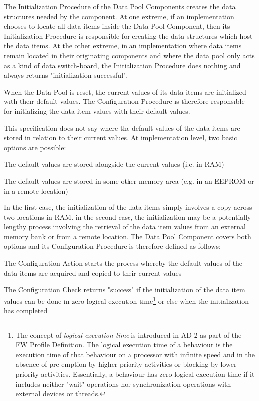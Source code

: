 \documentclass[a4paper,10pt]{article}
\newenvironment{fw_itemize}						%
{\begin{itemize}
  \setlength{\itemsep}{1mm}
  \setlength{\parskip}{0pt}
  \setlength{\parsep}{0pt}}
{\end{itemize}}
\newenvironment{fw_enumerate}					%
{\begin{enumerate}
  \setlength{\itemsep}{1mm}
  \setlength{\parskip}{0pt}
  \setlength{\parsep}{0pt}}
{\end{enumerate}}
\begin{document}
The Initialization Procedure of the Data Pool Components creates the data structures needed by the component. At one extreme, if an implementation chooses to locate all data items inside the Data Pool Component, then its Initialization Procedure is responsible for creating the data structures which host the data items. At the other extreme, in an implementation where data items remain located in their originating components and where the data pool only acts as a kind of data switch-board, the Initialization Procedure does nothing and always returns "initialization successful".

When the Data Pool is reset, the current values of its data items are initialized with their default values. The Configuration Procedure is therefore responsible for initializing the data item values with their default values. 

This specification does not say where the default values of the data items are stored in relation to their current values. At implementation level, two basic options are possible:

\begin{fw_enumerate}
\item The default values are stored alongside the current values (i.e. in RAM)
\item The default values are stored in some other memory area (e.g. in an EEPROM or in a remote location)
\end{fw_enumerate}

In the first case, the initialization of the data items simply involves a copy across two locations in RAM. in the second case, the initialization may be a potentially lengthy process involving the retrieval of the data item values from an external memory bank or from a remote location. The Data Pool Component covers both options and its Configuration Procedure is therefore defined as follows:

\begin{fw_itemize}
\item The Configuration Action starts the process whereby the default values of the data items are acquired and copied to their current values
\item The Configuration Check returns "success" if the initialization of the data item values can be done in zero logical execution time\footnote{The concept of \textit{logical execution time} is introduced in AD-2 as part of the FW Profile Definition. The logical execution time of a behaviour is the execution time of that behaviour on a processor with infinite speed and in the absence of pre-emption by higher-priority activities or blocking by lower-priority activities. Essentially, a behaviour has zero logical execution time if it includes neither "wait" operations nor synchronization operations with external devices or threads.} or else when the initialization has completed 
\end{fw_itemize}
\end{document}
